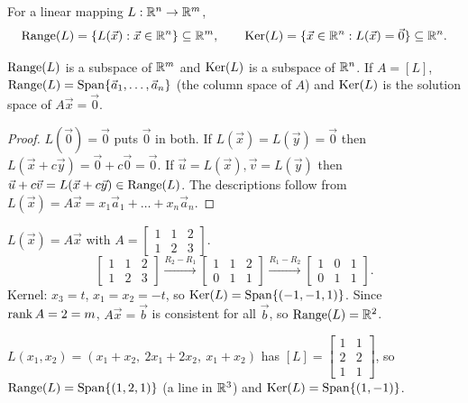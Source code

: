 \begin{definition}
For a linear mapping $L:\mathbb{R}^n\to\mathbb{R}^m$,
\[
  \operatorname{Range}(L)=\{L(\vec x):\vec x\in\mathbb{R}^n\}\subseteq\mathbb{R}^m, \qquad
  \operatorname{Ker}(L)=\{\vec x\in\mathbb{R}^n : L(\vec x)=\vec 0\}\subseteq\mathbb{R}^n.
\]
\end{definition}

\begin{theorem}
$\operatorname{Range}(L)$ is a subspace of $\mathbb{R}^m$ and $\operatorname{Ker}(L)$ is a subspace of $\mathbb{R}^n$. If $A=[L]$,
$\operatorname{Range}(L)=\operatorname{Span}\{\vec a_1,\dots,\vec a_n\}$ (the column space of $A$) and $\operatorname{Ker}(L)$ is the solution
space of $A\vec x=\vec 0$.
\end{theorem}
\begin{proof}
$L(\vec0)=\vec0$ puts $\vec 0$ in both. If $L(\vec x)=L(\vec y)=\vec 0$ then
$L(\vec x+c\vec y)=\vec 0+c\vec 0=\vec 0$. If $\vec u=L(\vec x),\vec v=L(\vec y)$ then
$\vec u+c\vec v=L(\vec x+c\vec y)\in\operatorname{Range}(L)$. The descriptions follow from
$L(\vec x)=A\vec x = x_1\vec a_1+\dots+x_n\vec a_n$.
\end{proof}

\begin{example}
$L(\vec x)=A\vec x$ with $A=\begin{bmatrix}1&1&2\\1&2&3\end{bmatrix}$.
\[
\begin{bmatrix}1&1&2\\1&2&3\end{bmatrix}\xrightarrow{R_2-R_1}\begin{bmatrix}1&1&2\\0&1&1\end{bmatrix}
\xrightarrow{R_1-R_2}\begin{bmatrix}1&0&1\\0&1&1\end{bmatrix}.
\]
Kernel: $x_3=t$, $x_1=x_2=-t$, so $\operatorname{Ker}(L)=\operatorname{Span}\{(-1,-1,1)\}$. Since $\operatorname{rank} A=2=m$, $A\vec x=\vec b$
is consistent for all $\vec b$, so $\operatorname{Range}(L)=\mathbb{R}^2$.
\end{example}

\begin{example}
$L(x_1,x_2)=(x_1+x_2,\ 2x_1+2x_2,\ x_1+x_2)$ has $[L]=\begin{bmatrix}1&1\\2&2\\1&1\end{bmatrix}$, so
$\operatorname{Range}(L)=\operatorname{Span}\{(1,2,1)\}$ (a line in $\mathbb{R}^3$) and $\operatorname{Ker}(L)=\operatorname{Span}\{(1,-1)\}$.
\end{example}

